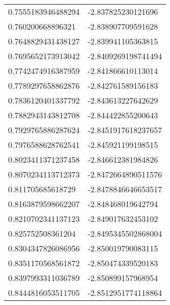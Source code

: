 \begin{supertabular}{ll}
0.7555183946488294  & -2.837825230121696   \\
0.760200668896321   & -2.838907709591628   \\
0.7648829431438127  & -2.839941105363815   \\
0.7695652173913042  & -2.8409269198741494  \\
0.7742474916387959  & -2.841866610113014   \\
0.7789297658862876  & -2.842761589156183   \\
0.7836120401337792  & -2.843613227642629   \\
0.7882943143812708  & -2.844422855200643   \\
0.7929765886287624  & -2.8451917618237657  \\
0.7976588628762541  & -2.845921199198515   \\
0.8023411371237458  & -2.846612381984826   \\
0.8070234113712373  & -2.8472664890511576  \\
0.811705685618729   & -2.8478846646653517  \\
0.8163879598662207  & -2.848468019642794   \\
0.8210702341137123  & -2.849017632453102   \\
0.825752508361204   & -2.8495345502868004  \\
0.8304347826086956  & -2.850019790083115   \\
0.8351170568561872  & -2.850474339520183   \\
0.8397993311036789  & -2.850899157968954   \\
0.8444816053511705  & -2.8512951774118864  \\
\end{supertabular}

